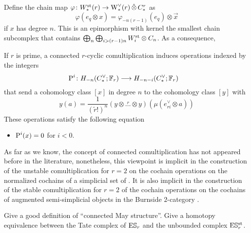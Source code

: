 Define the chain map $\varphi\colon \Wst(r)\to \rWd(r)\hotimes \rucadenas$ as
\[
	\varphi(e_q\otimes x) = \varphi_{-n(r-1)}(e_{q})\otimes \vec{x}
\]
if $x$ has degree $n$. This is an epimorphism with kernel the smallest chain subcomplex that contains $\bigoplus_n\bigoplus_{i>(r-1)n} \Wst[i]\otimes \ucadenas[n]$. As a consequence,



\begin{proposition}
	If $r$ is prime, a connected $r$-cyclic comultiplication induces operations indexed by the integers
	\begin{align*}
		\power^{i}\colon H_{-n}(\ucocadenas;\mathbb{F}_r)&\lra H_{-n-i}(\ucocadenas;\mathbb{F}_r)
	\end{align*}
	that send a cohomology class $[x]$ in degree $n$ to the cohomology class $[y]$ with
	\[
	y(a) = \frac{1}{(\tilde{r}!)^n}(y\otimes \overset{r}{\ldots}\otimes y)(\mu(e_{ri}^\vee\otimes a))
	\]
	These operations satisfy the following equation
	\begin{itemize}
		\item $\power^i(x) = 0$ for $i<0$.
	\end{itemize}
\end{proposition}

\begin{example}
As far as we know, the concept of connected comultiplication has not appeared before in the literature, nonetheless, this viewpoint is implicit in the construction of the unstable comultiplication for $r=2$ on the cochain operations on the normalized cochains of a simplicial set of \cite{medina2021fast_sq}. It is also implicit in the construction of the stable comultiplication for $r=2$ of the cochain operations on the cochains of augmented semi-simplicial objects in the Burnside $2$-category \cite{cantero-moran2020khovanov}.
\end{example}

\begin{question}
	Give a good definition of ``connected May structure''. Give a homotopy equivalence between the Tate complex of $\ES_r$ and the unbounded complex $\ESst_r$.
\end{question}

